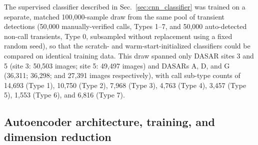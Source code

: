 \documentclass[preprint,NumberedRefs]{JASAnew}
\begin{document}
The supervised classifier described in Sec.~\ref{sec:cnn_classifier} was trained on a
separate, matched 100,000-sample draw from the same pool of transient detections (50,000
manually-verified calls, Types 1--7, and 50,000 auto-detected non-call transients, Type 0,
subsampled without replacement using a fixed random seed), so that the scratch- and
warm-start-initialized classifiers could be compared on identical training data. This
draw spanned only DASAR sites 3 and 5 (site 3: 50,503 images; site 5: 49,497 images) and
DASARs A, D, and G (36,311; 36,298; and 27,391 images respectively), with call sub-type
counts of 14,693 (Type 1), 10,750 (Type 2), 7,968 (Type 3), 4,763 (Type 4), 3,457 (Type
5), 1,553 (Type 6), and 6,816 (Type 7).

 
\subsection{\label{sec:autoencoder}Autoencoder architecture, training, and dimension reduction}


\end{document}
